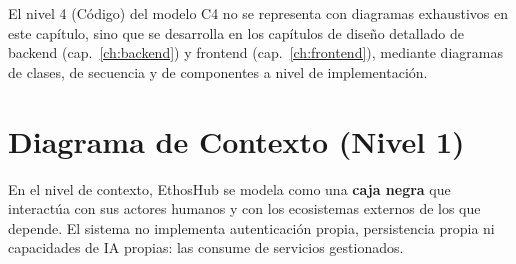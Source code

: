\begin{AvisoNota}
El nivel 4 (Código) del modelo C4 no se representa con diagramas exhaustivos en este
capítulo, sino que se desarrolla en los capítulos de diseño detallado de backend
(cap.~\ref{ch:backend}) y frontend (cap.~\ref{ch:frontend}), mediante diagramas de
clases, de secuencia y de componentes a nivel de implementación.
\end{AvisoNota}

\section{Diagrama de Contexto (Nivel 1)}
\label{sec:c4_contexto}

En el nivel de contexto, EthosHub se modela como una \textbf{caja negra} que
interactúa con sus actores humanos y con los ecosistemas externos de los que depende.
El sistema no implementa autenticación propia, persistencia propia ni capacidades de
IA propias: las consume de servicios gestionados.

